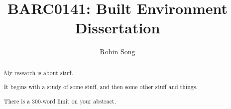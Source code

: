 \makeatletter
\renewcommand {\@degree@string} {Master of Science}
\makeatother
\makeatletter
\renewcommand {\@course@title} {Architectural Computation}
\makeatother
\makeatletter
\renewcommand {\@course@title@preposition} {in}
\makeatother


\title{BARC0141: Built Environment Dissertation}
\author{Robin Song}

\extradeclaration{}

\maketitle
\makedeclaration

\begin{abstract} %
    My research is about stuff.

    It begins with a study of some stuff, and then some other stuff and things.

    There is a 300-word limit on your abstract.
\end{abstract}


